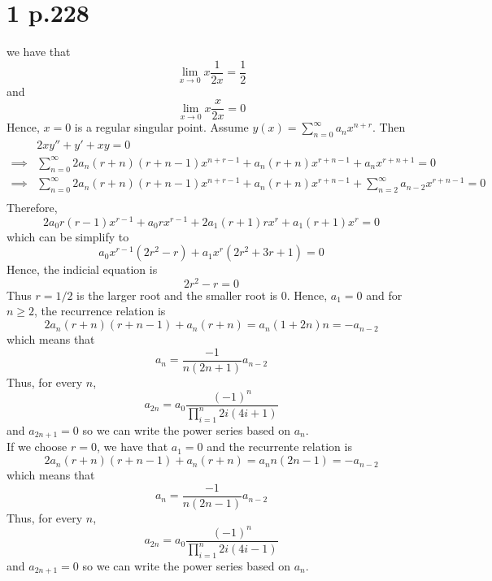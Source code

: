 \documentclass[11pt]{article}
\begin{document}
\section*{1 p.228}
we have that 
\[
    \lim_{x\to 0} x\frac{1}{2x} = \frac{1}{2}     
\]
and 
\[
    \lim_{x\to 0} x\frac{x}{2x} = 0    
\]
Hence, $x=0$ is a regular singular point.
Assume $y(x) = \sum_{n=0}^\infty a_nx^{n+r}$. Then 
\begin{equation*}
    \begin{aligned}
        &2xy'' + y' + xy = 0 \\
        \implies &  \sum_{n=0}^\infty 2a_n(r+n)(r+n-1)x^{n+r-1} + a_n (r+n)x^{r+n-1} +  a_nx^{r+n+1} = 0 \\
        \implies &  \sum_{n=0}^\infty 2a_n(r+n)(r+n-1)x^{n+r-1} + a_n (r+n)x^{r+n-1} +  \sum_{n=2}^\infty a_{n-2}x^{r+n-1} = 0 \\
    \end{aligned}
\end{equation*}
Therefore, 
\[
    2a_0 r(r-1)x^{r-1} + a_0 rx^{r-1} + 2a_1(r+1)rx^r + a_1(r+1)x^r = 0  
\]
which can be simplify to
\[
    a_0x^{r-1}(2r^2 - r) + a_1x^r(2r^2 + 3r + 1) = 0    
\]
Hence, the indicial equation is
\[
    2r^2-r=0
\]
Thus $r=1/2$ is the larger root and the smaller root is $0$.
Hence, $a_1 = 0$ and for $n\ge 2$, the recurrence relation is 
\[
    2a_n(r+n)(r+n-1) + a_n(r+n) = a_n(1+2n)n= -a_{n-2}
\]
which means that 
\[
    a_n = \frac{-1}{n(2n+1)}a_{n-2}    
\]
Thus, for every $n$, 
\[
    a_{2n} = a_0  \frac{(-1)^n}{ \prod_{i=1}^n 2i (4i + 1)}    
\]
and $a_{2n+1} = 0$
so we can write the power series based on $a_n$. \\
If we choose $r = 0$, we have that $a_1 = 0$ and the recurrente relation is 
\[
    2a_n(r+n)(r+n-1) + a_n(r+n) = a_n n(2n-1)= -a_{n-2}
\]
which means that 
\[
    a_n = \frac{-1}{n(2n-1)}a_{n-2}    
\]
Thus, for every $n$, 
\[
    a_{2n} = a_0  \frac{(-1)^n}{ \prod_{i=1}^n 2i (4i - 1)}    
\]
and $a_{2n+1} = 0$
so we can write the power series based on $a_n$.
\end{document}
